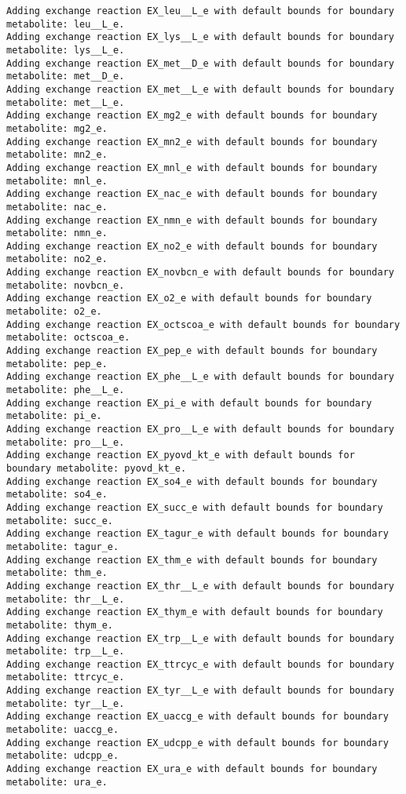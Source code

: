 \documentclass[
  letterpaper,
  DIV=11,
  numbers=noendperiod]{scrartcl}
\begin{document}
\begin{verbatim}
Adding exchange reaction EX_leu__L_e with default bounds for boundary metabolite: leu__L_e.
Adding exchange reaction EX_lys__L_e with default bounds for boundary metabolite: lys__L_e.
Adding exchange reaction EX_met__D_e with default bounds for boundary metabolite: met__D_e.
Adding exchange reaction EX_met__L_e with default bounds for boundary metabolite: met__L_e.
Adding exchange reaction EX_mg2_e with default bounds for boundary metabolite: mg2_e.
Adding exchange reaction EX_mn2_e with default bounds for boundary metabolite: mn2_e.
Adding exchange reaction EX_mnl_e with default bounds for boundary metabolite: mnl_e.
Adding exchange reaction EX_nac_e with default bounds for boundary metabolite: nac_e.
Adding exchange reaction EX_nmn_e with default bounds for boundary metabolite: nmn_e.
Adding exchange reaction EX_no2_e with default bounds for boundary metabolite: no2_e.
Adding exchange reaction EX_novbcn_e with default bounds for boundary metabolite: novbcn_e.
Adding exchange reaction EX_o2_e with default bounds for boundary metabolite: o2_e.
Adding exchange reaction EX_octscoa_e with default bounds for boundary metabolite: octscoa_e.
Adding exchange reaction EX_pep_e with default bounds for boundary metabolite: pep_e.
Adding exchange reaction EX_phe__L_e with default bounds for boundary metabolite: phe__L_e.
Adding exchange reaction EX_pi_e with default bounds for boundary metabolite: pi_e.
Adding exchange reaction EX_pro__L_e with default bounds for boundary metabolite: pro__L_e.
Adding exchange reaction EX_pyovd_kt_e with default bounds for boundary metabolite: pyovd_kt_e.
Adding exchange reaction EX_so4_e with default bounds for boundary metabolite: so4_e.
Adding exchange reaction EX_succ_e with default bounds for boundary metabolite: succ_e.
Adding exchange reaction EX_tagur_e with default bounds for boundary metabolite: tagur_e.
Adding exchange reaction EX_thm_e with default bounds for boundary metabolite: thm_e.
Adding exchange reaction EX_thr__L_e with default bounds for boundary metabolite: thr__L_e.
Adding exchange reaction EX_thym_e with default bounds for boundary metabolite: thym_e.
Adding exchange reaction EX_trp__L_e with default bounds for boundary metabolite: trp__L_e.
Adding exchange reaction EX_ttrcyc_e with default bounds for boundary metabolite: ttrcyc_e.
Adding exchange reaction EX_tyr__L_e with default bounds for boundary metabolite: tyr__L_e.
Adding exchange reaction EX_uaccg_e with default bounds for boundary metabolite: uaccg_e.
Adding exchange reaction EX_udcpp_e with default bounds for boundary metabolite: udcpp_e.
Adding exchange reaction EX_ura_e with default bounds for boundary metabolite: ura_e.

\end{verbatim}
\end{document}

